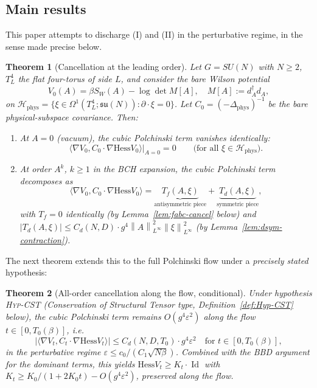 \documentclass[11pt,a4paper]{amsart}
\newtheorem{theorem}{Theorem}[section]
\theoremstyle{definition}
\newcommand{\su}{\mathfrak{su}}
\newcommand{\norm}[1]{\left\lVert#1\right\rVert}
\newcommand{\abs}[1]{\left\lvert#1\right\rvert}
\newcommand{\Hess}{\mathrm{Hess}}
\DeclareMathOperator{\id}{Id}
\begin{document}
\subsection{Main results}

This paper attempts to discharge (I) and (II) in the perturbative regime,
in the sense made precise below.

\begin{theorem}[Cancellation at the leading order]\label{thm:cancel-leading}
Let $G = SU(N)$ with $N \geq 2$, $T^4_L$ the flat four-torus of side $L$,
and consider the bare Wilson potential
\[
V_0(A) = \beta S_W(A) - \log\det M[A], \quad
M[A] := d_A^\dagger d_A,
\]
on $\mathcal H_{\mathrm{phys}} = \{\xi \in \Omega^1(T^4_L; \su(N)):
\partial \cdot \xi = 0\}$. Let $C_0 = (-\Delta_{\mathrm{phys}})^{-1}$ be
the bare physical-subspace covariance. Then:
\begin{enumerate}[label=(\alph*),leftmargin=2em]
\item At $A = 0$ (vacuum), the cubic Polchinski term vanishes
identically:
\[
\bigl\langle \nabla V_0, C_0 \cdot \nabla \Hess V_0\bigr\rangle\Bigr|_{A=0} = 0
\qquad \text{(for all } \xi \in \mathcal H_{\mathrm{phys}}\text{).}
\]
\item At order $A^k$, $k \geq 1$ in the BCH expansion, the cubic
Polchinski term decomposes as
\[
\bigl\langle \nabla V_0, C_0 \cdot \nabla \Hess V_0\bigr\rangle
= \underbrace{T_f(A, \xi)}_{\text{antisymmetric piece}} + \underbrace{T_d(A, \xi)}_{\text{symmetric piece}},
\]
with $T_f = 0$ identically (by Lemma~\ref{lem:fabc-cancel} below) and
$\abs{T_d(A, \xi)} \leq C_d(N, D) \cdot g^4 \norm{A}^2_{L^\infty}
\norm{\xi}^2_{L^\infty}$ (by Lemma~\ref{lem:dsym-contraction}).
\end{enumerate}
\end{theorem}

The next theorem extends this to the full Polchinski flow under a
\emph{precisely stated} hypothesis:

\begin{theorem}[All-order cancellation along the flow, conditional]\label{thm:cancel-flow}
Under hypothesis \textsc{Hyp-CST} (Conservation of Structural Tensor
type, Definition~\ref{def:Hyp-CST} below), the cubic Polchinski term
remains $O(g^4 \varepsilon^2)$ along the flow $t \in [0, T_0(\beta)]$,
i.e.\
\[
\bigl|\langle \nabla V_t, C_t \cdot \nabla \Hess V_t\rangle\bigr|
\leq C_d(N, D, T_0) \cdot g^4 \varepsilon^2 \quad \text{for } t \in [0, T_0(\beta)],
\]
in the perturbative regime $\varepsilon \leq c_0/(C_1 \sqrt{N\beta})$.
Combined with the BBD argument for the dominant terms, this yields
$\Hess V_t \geq K_t \cdot \id$ with $K_t \geq K_0 / (1 + 2 K_0 t) - O(g^4 \varepsilon^2)$,
preserved along the flow.
\end{theorem}
\end{document}
